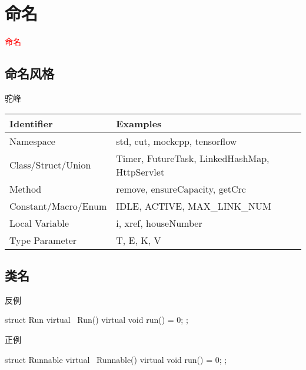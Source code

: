 \section{命名}
\label{sec:bad-smells}

\begin{frame}
  \begin{center}
    \Huge{\textcolor{red}{命名}}
  \end{center}
\end{frame}

\subsection{命名风格}

\begin{frame}[fragile]{驼峰}
\begin{table}[!htb]
\begin{tabular*}{1.0\textwidth}{@{}ll@{}}
\hline
Identifier & Examples \\
\hline
Namespace  & std, cut, mockcpp, tensorflow \\
Class/Struct/Union & Timer, FutureTask, LinkedHashMap, HttpServlet \\ 
Method & remove, ensureCapacity, getCrc \\
Constant/Macro/Enum & IDLE, ACTIVE, MAX\_LINK\_NUM \\
Local Variable & i, xref, houseNumber \\
Type Parameter & T, E, K, V \\
\hline
\end{tabular*}
\end{table}
\end{frame}

\subsection{类名}

\begin{frame}[fragile]{反例}
  \begin{c++}
struct Run {
  virtual ~Run() {}
  virtual void run() = 0;
};
  \end{c++}
\end{frame}

\begin{frame}[fragile]{正例}
  \begin{c++}
struct Runnable {
  virtual ~Runnable() {}
  virtual void run() = 0;
};
  \end{c++}
\end{frame}

